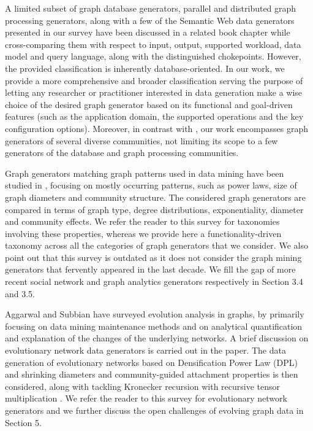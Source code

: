 A limited subset of graph database
generators, parallel and distributed graph processing generators, along
with a few of the Semantic Web data generators presented in our survey have
been discussed in a related book chapter
\cite{BFHI18} while cross-comparing them with respect to input, output,
supported workload, data model and query language, along with the
distinguished chokepoints. However, the provided classification is
inherently database-oriented.
In our work, we provide a more comprehensive and broader classification
 serving the purpose of letting any
researcher or practitioner interested in data generation make a wise
choice of the desired graph
generator based on its functional and goal-driven features (such as the application domain,
the supported operations and the key configuration options).
Moreover, in contrast with \cite{BFHI18}, our work encompasses graph generators of several
diverse communities, not limiting its scope to a few generators of the database
and graph processing communities.

Graph generators matching graph patterns used in data mining have been
studied in \cite{Chakrabarti:2006:GML:1132952.1132954},
focusing on mostly occurring patterns, such as power laws, size of graph diameters
and community structure. The considered graph generators are compared in
terms of graph type, degree distributions, exponentiality, diameter and
community effects. We refer the reader to this survey for taxonomies
involving these properties, whereas we provide here a functionality-driven
taxonomy across all the categories of graph generators that we consider.
We also point out that this survey is outdated as it does not consider the
graph mining generators that fervently appeared in the last decade.
We fill the gap of more recent social network and graph analytics generators
respectively in Section 3.4 and 3.5.


Aggarwal and Subbian \cite{AggarwalS14} have surveyed evolution analysis in
graphs, by primarily focusing on data mining maintenance methods and on analytical
quantification and explanation of the changes of the underlying networks.
A brief discussion on evolutionary
network data generators is carried out in
the paper. The data generation of evolutionary networks based on
Densification Power Law (DPL) and shrinking diameters \cite{LeskovecKF05} and community-guided
attachment properties \cite{LeskovecKF05} is then considered, along with tackling Kronecker
recursion with recursive tensor multiplication \cite{AkogluMF08}.
We refer the reader to this survey for evolutionary network generators and
we further discuss the open challenges of evolving graph data in Section 5.

